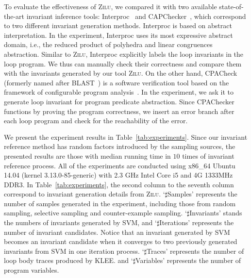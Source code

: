 To evaluate the effectiveness of \textsc{Zilu}, 
we compared it with two available state-of-the-art invariant inference tools: 
Interproc~\cite{cite} and CAPChecker~\cite{cite}, 
which correspond to two different invariant generation methods. 
Interproc is based on abstract interpretation. 
In the experiment, Interproc uses its most expressive abstract domain, i.e., 
the reduced product of polyhedra and linear congruences abstraction. 
Similar to \textsc{Zilu}, Interproc explicitly labels the loop invariants in the loop program. 
We thus can manually check their correctness
and compare them with the invariants generated by our tool \textsc{Zilu}. 
On the other hand, CPACheck (formerly named after BLAST~\cite{cite}) is a software verification tool 
based on the framework of configurable program analysis~\cite{cite}. 
In the experiment, we ask it to generate loop invariant for program predicate abstraction. 
Since CPAChecker functions by proving the program correctness, 
we insert an error branch after each loop program and check for the reachability of the error. 

We present the experiment results in Table~\ref{tab:experiments}. 
Since our invariant reference method has random factors introduced by the sampling sources, 
the presented results are those with median running time in $10$ times of invariant reference process. 
All of the experiments are conducted using x86\_64 Ubuntu 14.04 (kernel 3.13.0-85-generic) 
with 2.3 GHz Intel Core i5 and 4G 1333MHz DDR3. 
In Table~\ref{tab:experiments}, the second column to the seventh column correspond to 
invariant generation details from \textsc{Zilu}. 
`$\sharp$Samples' represents the number of samples generated in the experiment, 
including those from random sampling, selective sampling and counter-example sampling. 
`$\sharp$Invariants' stands the numbers of invariants generated by SVM, 
and `$\sharp$Iterations' represents the number of invariant candidates. 
Notice that an invariant generated by SVM becomes an invariant candidate 
when it converges to two previously generated invariants from SVM in one iteration process. 
`$\sharp$Traces' represents the number of loop body traces produced by KLEE. 
and `$\sharp$Variables' represents the number of program variables. 




